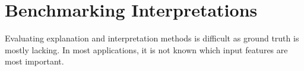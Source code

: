 \section{Benchmarking Interpretations}
\label{sec:benchmarking}

Evaluating explanation and interpretation methods is difficult as ground truth is mostly lacking. In most applications, it is not known which input features are most important. 



